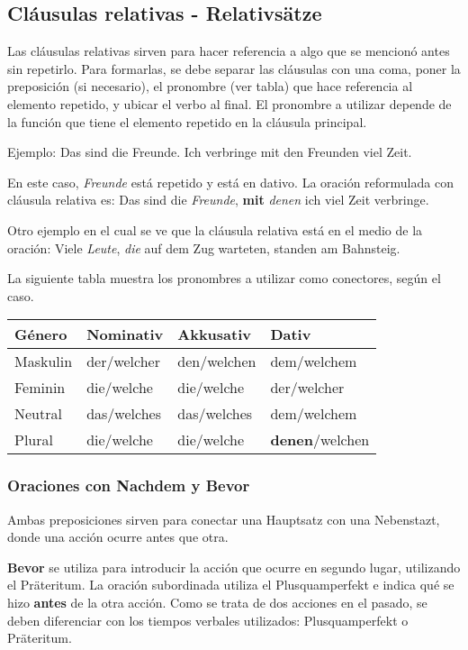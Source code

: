 \subsection{Cláusulas relativas - Relativsätze}
Las cláusulas relativas sirven para hacer referencia a algo que se mencionó antes sin repetirlo. Para formarlas, se debe separar las cláusulas con una coma, poner la preposición (si necesario), el pronombre (ver tabla) que hace referencia al elemento repetido, y ubicar el verbo al final. El pronombre a utilizar depende de la función que tiene el elemento repetido en la cláusula principal.

Ejemplo: Das sind die Freunde. Ich verbringe mit den Freunden viel Zeit. 

En este caso, \textit{Freunde} está repetido y está en dativo. La oración reformulada con cláusula relativa es: Das sind die \textit{Freunde}, \textbf{mit} \textit{denen} ich viel Zeit verbringe.

Otro ejemplo en el cual se ve que la cláusula relativa está en el medio de la oración: Viele \textit{Leute}, \textit{die} auf dem Zug warteten, standen am Bahnsteig.


La siguiente tabla muestra los pronombres a utilizar como conectores, según el caso.

\begin{tabular}{| l | l | l | l |}
\hline
\textbf{Género} & \textbf{Nominativ} & \textbf{Akkusativ} & \textbf{Dativ}\\
\hline
Maskulin & der/welcher & den/welchen & dem/welchem  \\
Feminin  & die/welche  & die/welche  & der/welcher \\
Neutral  & das/welches & das/welches & dem/welchem \\
Plural   & die/welche  & die/welche  & \textbf{denen}/welchen \\
\hline
\end{tabular}

\subsubsection{Oraciones con Nachdem y Bevor}
Ambas preposiciones sirven para conectar una Hauptsatz con una Nebenstazt, donde una acción ocurre antes que otra. 

\textbf{Bevor} se utiliza para introducir la acción que ocurre en segundo lugar, utilizando el Präteritum. La oración subordinada utiliza el Plusquamperfekt e indica qué se hizo \textbf{antes} de la otra acción. Como se trata de dos acciones en el pasado, se deben diferenciar con los tiempos verbales utilizados: Plusquamperfekt o Präteritum.

